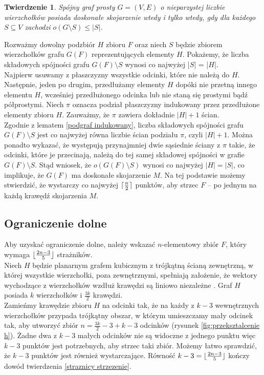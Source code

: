 \documentclass[brudnopis]{xmgr}
\DeclarePairedDelimiter\ceil{\lceil}{\rceil}
\DeclarePairedDelimiter\floor{\lfloor}{\rfloor}
\newtheorem{Twierdzenie}{Twierdzenie}
\theoremstyle{definition}
\begin{document}
\begin{Twierdzenie} \cite{tutte}
	Spójny graf prosty $G=(V,E)$ o nieparzystej liczbie wierzchołków posiada doskonałe skojarzenie wtedy i tylko wtedy, gdy dla każdego $S \subseteq V$ zachodzi $o(G \setminus S) \le |S|$.
\end{Twierdzenie}

Rozważmy dowolny podzbiór $H$ zbioru $F$ oraz niech $S$ będzie zbiorem wierzchołków grafu $G(F)$ reprezentujących elementy $H$. Pokażemy, że liczba składowych spójności grafu $G(F) \setminus S$ wynosi co najwyżej |$S$| = |$H$|.
\\\indent Najpierw usuwamy z płaszczyzny wszystkie odcinki, które nie należą do $H$. Następnie, jeden po drugim, przedłużamy elementy $H$ dopóki nie przetną innego elementu $H$, wcześniej przedłużonego odcinka lub nie staną się prostymi bądź półprostymi. Niech $\pi$ oznacza podział płaszczyzny indukowany przez przedłużone elementy zbioru $H$. Zauważmy, że $\pi$ zawiera dokładnie $|H| + 1$ ścian. 
\\\indent Zgodnie z lematem \ref{podgraf indukowany}, liczba składowych spójności grafu $G(F) \setminus S$ jest co najwyżej równa liczbie ścian podziału $\pi$, czyli $|H| + 1$. Można ponadto wykazać, że występują przynajmniej dwie sąsiednie ściany z $\pi$ takie, że odcinki, które je przecinają, należą do tej samej składowej spójności w grafie $G(F) \setminus S$. Stąd wniosek, że $o (G(F) \setminus S)$ wynosi co najwyżej $|H| = |S|$, co implikuje, że $G(F)$ ma doskonałe skojarzenie $M$. Na tej podstawie możemy stwierdzić, że wystarczy co najwyżej $\ceil{\frac{n}{2}}$ punktów, aby strzec $F$ -- po jednym na każdą krawędź skojarzenia $M$. 
\subsection{Ograniczenie dolne}
\indent Aby uzyskać ograniczenie dolne, należy wskazać $n$-elementowy zbiór $F$, który wymaga $\floor{\frac{2n-3}{5}}$ strażników.
\\\indent Niech $H$ będzie planarnym grafem kubicznym z trójkątną ścianą zewnętrzną, w której wszystkie wierzchołki, poza zewnętrznymi, spełniają założenie, że wektory wychodzące z wierzchołków wzdłuż krawędzi są liniowo niezależne \cite{topp}. Graf $H$ posiada $k$ wierzchołków i $\frac{3k}{2}$ krawędzi.
\\\indent {} Zamieńmy krawędzie zbioru $H$ na odcinki tak, że na każdy z $k - 3$ wewnętrznych wierzchołków przypada trójkątny obszar, w którym umieszczamy mały odcinek tak, aby utworzyć zbiór $n = \frac{3k}{2} - 3 + k  - 3$ odcinków (rysunek \ref{fig:przeksztalcenie h}). Żadne dwa z $k - 3$ małych odcinków nie są widoczne z jednego punktu więc $k - 3$ punktów jest potrzebnych, aby strzec taki zbiór. Możemy łatwo sprawdzić, że $k - 3$ punktów jest również wystarczające. Równość $k - 3 = \floor{\frac{2n - 3}{5}}$ kończy dowód twierdzenia \ref{straznicy strzezenie}.
\end{document}

